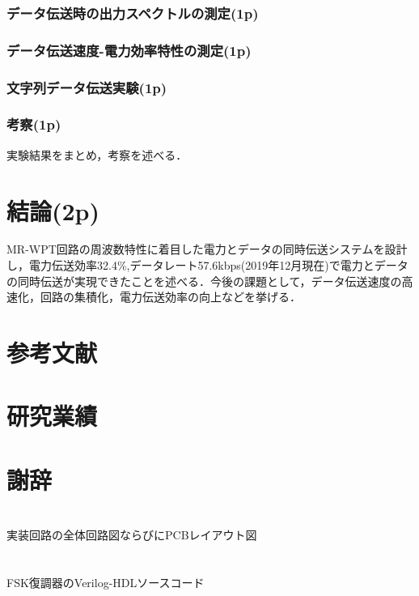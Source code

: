 \documentclass{jsarticle}
\begin{document}
\subsubsection{データ伝送時の出力スペクトルの測定(1p)}

\subsubsection{データ伝送速度-電力効率特性の測定(1p)}

\subsubsection{文字列データ伝送実験(1p)}

\subsubsection{考察(1p)}
実験結果をまとめ，考察を述べる．

\section{結論(2p)}
MR-WPT回路の周波数特性に着目した電力とデータの同時伝送システムを設計し，電力伝送効率32.4\%,データレート57.6kbps(2019年12月現在)で電力とデータの同時伝送が実現できたことを述べる．今後の課題として，データ伝送速度の高速化，回路の集積化，電力伝送効率の向上などを挙げる．

\section*{参考文献}
\section*{研究業績}
\section*{謝辞}



\appendix
\section{}実装回路の全体回路図ならびにPCBレイアウト図
\section{}FSK復調器のVerilog-HDLソースコード
\end{document}
